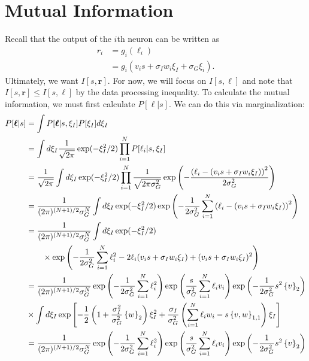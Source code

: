 \documentclass[11pt]{article}
\begin{document}
\section{Mutual Information}

Recall that the output of the $i$th neuron can be written as 
\begin{align}
	r_i &= g_i(\ell_i) \\
	&= g_i(v_i s + \sigma_I w_i \xi_I + \sigma_G\xi_i).
\end{align}
Ultimately, we want $I[s, \mathbf{r}]$. For now, we will focus on $I[s, \boldsymbol{\ell}]$ and note that $I[s,\mathbf{r}] \leq I[s, \boldsymbol{\ell}]$ by the data processing inequality. To calculate the mutual information, we must first calculate $P[\boldsymbol{\ell}|s]$. We can do this via marginalization:
\begin{align}
	P[\boldsymbol{\ell}|s] &= \int P[\boldsymbol{\ell}|s, \xi_I] P[\xi_I]d\xi_I \\
	&= \int d\xi_I  \frac{1}{\sqrt{2\pi}} \exp(-\xi_I^2/2) \prod_{i=1}^N P[\ell_i|s,\xi_I] \\
	&=  \frac{1}{\sqrt{2\pi}} \int d\xi_I   \exp(-\xi_I^2/2) \prod_{i=1}^N \frac{1}{\sqrt{2\pi \sigma_G^2}} \exp\left(-\frac{\left(\ell_i - (v_i s + \sigma_I w_i \xi_I)\right)^2}{2\sigma_G^2}\right) \\
	&= \frac{1}{(2\pi)^{(N+1)/2}\sigma_G^N} \int d\xi_I \exp(-\xi_I^2/2) \exp\left(-\frac{1}{2\sigma_G^2}\sum_{i=1}^N \left(\ell_i - (v_i s + \sigma_I w_i \xi_I)\right)^2\right) \\
	&= \frac{1}{(2\pi)^{(N+1)/2}\sigma_G^N} \int d\xi_I \exp(-\xi_I^2/2) \notag \\
	& \qquad \times \exp\left(-\frac{1}{2\sigma_G^2}\sum_{i=1}^N \ell_i^2 -2\ell_i (v_i s + \sigma_I w_i \xi_I) + (v_i s + \sigma_I w_i \xi_I)^2\right) \\
	&= \frac{1}{(2\pi)^{(N+1)/2}\sigma_G^N} \exp\left(-\frac{1}{2\sigma_G^2}\sum_{i=1}^N \ell_i^2\right)\exp\left(\frac{s}{\sigma_G^2}\sum_{i=1}^N \ell_i v_i \right)\exp\left(-\frac{1}{2\sigma_G^2}s^2 \left\{v\right\}_2\right) \notag \\
	&\times \int d\xi_I\exp\left[-\frac{1}{2}\left(1+\frac{\sigma_I^2}{\sigma_G^2} \left\{w\right\}_2\right)\xi_I^2 +\frac{\sigma_I}{\sigma_G^2}\left( \sum_{i=1}^N \ell_i w_i - s \left\{v,w\right\}_{1,1}\right)\xi_I \right] \\
	&=  \frac{1}{(2\pi)^{(N+1)/2}\sigma_G^N}\exp\left(-\frac{1}{2\sigma_G^2}\sum_{i=1}^N \ell_i^2\right)\exp\left(\frac{s}{\sigma_G^2}\sum_{i=1}^N \ell_i v_i \right)\exp\left(-\frac{1}{2\sigma_G^2}s^2 \left\{v\right\}_2\right) \notag \\

\end{align}
\end{document}
